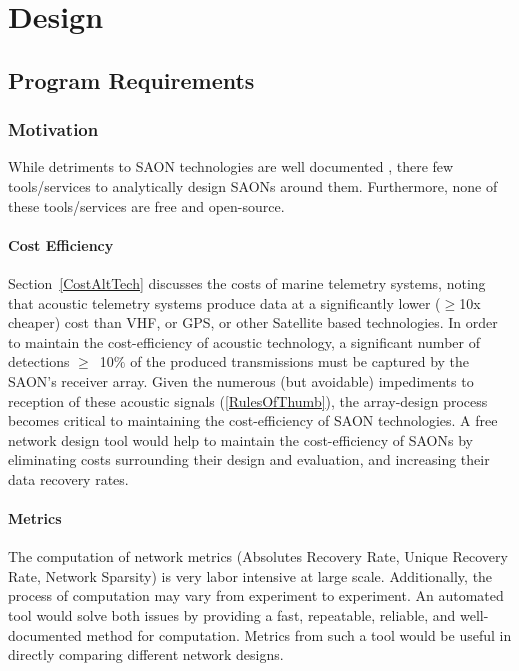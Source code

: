 \chapter{Design}
\label{design}
\section{Program Requirements}
\label{programRequirements}

\subsection{Motivation}
While detriments to SAON technologies are well documented \cite{Akbarzadeh2013} \cite{Heupel2006} \cite{Howard2002}  \cite{Kessel2015} \cite{Steel2014}, there few tools/services to analytically design SAONs around them.  Furthermore, none of these tools/services are free and open-source.


\subsubsection{Cost Efficiency}
\label{motivationCost}
Section~\ref{CostAltTech} discusses the costs of marine telemetry systems, noting that acoustic telemetry systems produce data at a significantly lower ($\ge$10x cheaper) cost than VHF, or GPS, or other Satellite based technologies.  In order to maintain the cost-efficiency of acoustic technology, a significant number of detections $\ge$~10$\%$ of the produced transmissions must be captured by the SAON's receiver array.  Given the numerous (but avoidable) impediments to reception of these acoustic signals (\ref{RulesOfThumb}), the array-design process becomes critical to maintaining the cost-efficiency of SAON technologies.  A free network design tool would help to maintain the cost-efficiency of SAONs by eliminating costs surrounding their design and evaluation, and increasing their data recovery rates.  


\subsubsection{Metrics}
\label{motivationMetrics}
The computation of network metrics (Absolutes Recovery Rate, Unique Recovery Rate, Network Sparsity) is very labor intensive at large scale.  Additionally, the process of computation may vary from experiment to experiment.  An automated tool would solve both issues by providing a fast, repeatable, reliable, and well-documented method for computation.  Metrics from such a tool would be useful in directly comparing different network designs.


